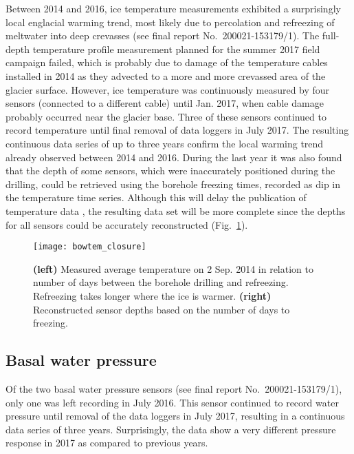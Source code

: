 \documentclass{article}
\begin{document}
    Between 2014 and 2016, ice temperature measurements exhibited a
    surprisingly local englacial warming trend, most likely due to percolation
    and refreezing of meltwater into deep crevasses (see final report
    No.~200021-153179/1). The full-depth temperature profile measurement
    planned for the summer 2017 field campaign failed, which is probably due to
    damage of the temperature cables installed in 2014 as they advected to a
    more and more crevassed area of the glacier surface. However, ice
    temperature was continuously measured by four sensors (connected to a
    different cable) until Jan. 2017, when cable damage probably occurred near
    the glacier base. Three of these sensors continued to record temperature
    until final removal of data loggers in July 2017. The resulting continuous
    data series of up to three years confirm the local warming trend already
    observed between 2014 and 2016. During the last year it was also found that
    the depth of some sensors, which were inaccurately positioned during the
    drilling, could be retrieved using the borehole freezing times, recorded as
    dip in the temperature time series. Although this will delay the
    publication of temperature data \citep{Seguinot.Funk.Inprep}, the resulting
    data set will be more complete since the depths for all sensors could be
    accurately reconstructed (Fig.~\ref{fig:closure}).

    \begin{figure}
      \centerline{\texttt{[image: bowtem\_closure]}}
      \caption{\textbf{(left)} Measured average temperature on 2 Sep. 2014 in
               relation to number of days between the borehole drilling and
               refreezing. Refreezing takes longer where the ice is warmer.
               \textbf{(right)} Reconstructed sensor depths based on the number
               of days to freezing.}
      \label{fig:closure}
    \end{figure}


\subsection{Basal water pressure}

    Of the two basal water pressure sensors (see final report
    No.~200021-153179/1), only one was left recording in July 2016. This sensor
    continued to record water pressure until removal of the data loggers in
    July 2017, resulting in a continuous data series of three years.
    Surprisingly, the data show a very different pressure response in 2017 as
    compared to previous years.
\end{document}
